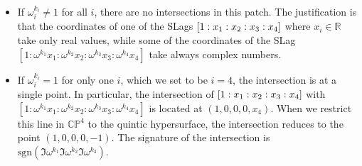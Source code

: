 \begin{itemize}
  \item If $\omega_i^{k_i}\neq 1$ for all $i$, there are no intersections in this patch. 
    The justification is that the coordinates of one of the SLags $\qty[1:x_1:x_2:x_3:x_4]$ where $x_i\in\mathbb R$ take only real values,
    while some of the coordinates of the SLag $[1:\omega^{k_1}x_1:\omega^{k_2}x_2:\omega^{k_3}x_3:\omega^{k_4}x_4]$ take
    always complex numbers.

  \item If $\omega_i^{k_i}= 1$ for only one $i$, which we set to be $i=4$, the intersection 
    is at a single point.
    In particular, the intersection of $\qty[1:x_1:x_2:x_3:x_4]$ with $[1:\omega^{k_1}x_1:\omega^{k_2}x_2:\omega^{k_3}x_3:\omega^{k_4}x_4]$
    is located at $(1,0,0,0,x_4)$. 
    When we restrict this line in $\mathbb{CP}^4$ to the quintic hypersurface, the intersection reduces to the point $(1,0,0,0,-1)$.
    The signature of the intersection is $\mathrm{sgn}(\Im \omega^{k_1}\Im\omega^{k_2}\Im\omega^{k_3})$. 


\end{itemize}
